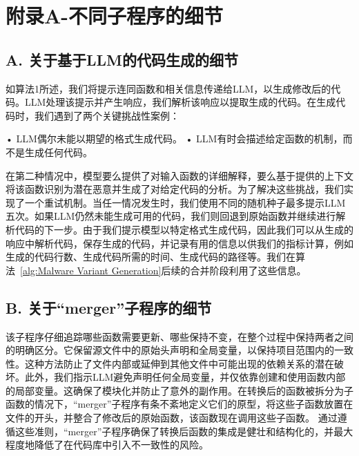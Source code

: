 \chapter{附录A-不同子程序的细节}
\section{A. 关于基于LLM的代码生成的细节}
如算法1所述，我们将提示连同函数和相关信息传递给LLM，以生成修改后的代码。LLM处理该提示并产生响应，我们解析该响应以提取生成的代码。在生成代码时，我们遇到了两个关键挑战性案例：

• LLM偶尔未能以期望的格式生成代码。
• LLM有时会描述给定函数的机制，而不是生成任何代码。

在第二种情况中，模型要么提供了对输入函数的详细解释，要么基于提供的上下文将该函数识别为潜在恶意并生成了对给定代码的分析。为了解决这些挑战，我们实现了一个重试机制。当任一情况发生时，我们使用不同的随机种子最多提示LLM五次。如果LLM仍然未能生成可用的代码，我们则回退到原始函数并继续进行解析代码的下一步。由于我们提示模型以特定格式生成代码，因此我们可以从生成的响应中解析代码，保存生成的代码，并记录有用的信息以供我们的指标计算，例如生成的代码行数、生成代码所需的时间、生成代码的路径等。我们在算法~\ref{alg:Malware Variant Generation}后续的合并阶段利用了这些信息。

\section{B. 关于“merger”子程序的细节}
该子程序仔细追踪哪些函数需要更新、哪些保持不变，在整个过程中保持两者之间的明确区分。它保留源文件中的原始头声明和全局变量，以保持项目范围内的一致性。这种方法防止了文件内部或延伸到其他文件中可能出现的依赖关系的潜在破坏。此外，我们指示LLM避免声明任何全局变量，并仅依靠创建和使用函数内部的局部变量。这确保了模块化并防止了意外的副作用。在转换后的函数被拆分为子函数的情况下，“merger”子程序有条不紊地定义它们的原型，将这些子函数放置在文件的开头，并整合了修改后的原始函数，该函数现在调用这些子函数。
通过遵循这些准则，“merger”子程序确保了转换后函数的集成是健壮和结构化的，并最大程度地降低了在代码库中引入不一致性的风险。

